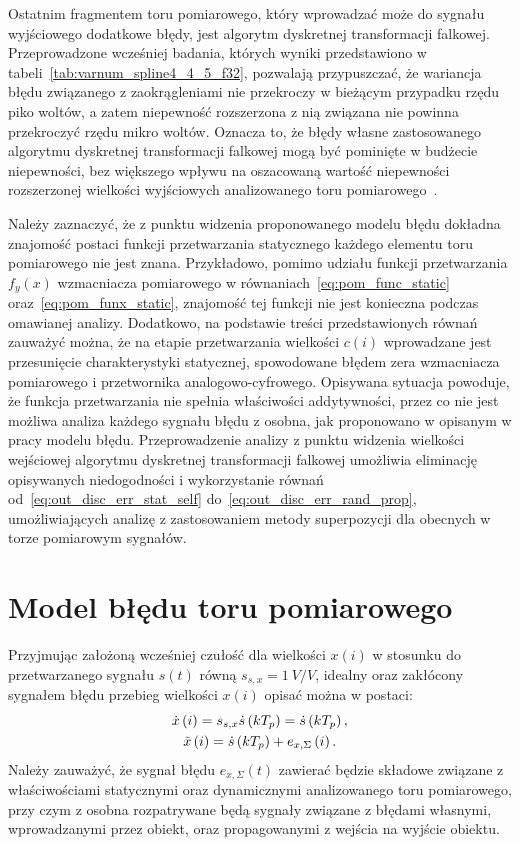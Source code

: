 Ostatnim fragmentem toru pomiarowego, który wprowadzać może do sygnału wyjściowego dodatkowe błędy, jest algorytm dyskretnej transformacji falkowej. Przeprowadzone wcześniej badania, których wyniki przedstawiono w tabeli~\ref{tab:varnum_spline4_4_5_f32}, pozwalają przypuszczać, że wariancja błędu związanego z zaokrągleniami nie przekroczy w bieżącym przypadku rzędu piko woltów, a zatem niepewność rozszerzona z nią związana nie powinna przekroczyć rzędu mikro woltów. Oznacza to, że błędy własne zastosowanego algorytmu dyskretnej transformacji falkowej mogą być pominięte w budżecie niepewności, bez większego wpływu na oszacowaną wartość niepewności rozszerzonej wielkości wyjściowych analizowanego toru pomiarowego~\cite{jcgm_guide}.

Należy zaznaczyć, że z punktu widzenia proponowanego modelu błędu dokładna znajomość postaci funkcji przetwarzania statycznego każdego elementu toru pomiarowego nie jest znana. Przykładowo, pomimo udziału funkcji przetwarzania $f_{y}(x)$ wzmacniacza pomiarowego w równaniach~\eqref{eq:pom_func_static} oraz~\eqref{eq:pom_funx_static}, znajomość tej funkcji nie jest konieczna podczas omawianej analizy. Dodatkowo, na podstawie treści przedstawionych równań zauważyć można, że na etapie przetwarzania wielkości $c(i)$ wprowadzane jest przesunięcie charakterystyki statycznej, spowodowane błędem zera wzmacniacza pomiarowego i przetwornika analogowo-cyfrowego. Opisywana sytuacja powoduje, że funkcja przetwarzania nie spełnia właściwości addytywności, przez co nie jest możliwa analiza każdego sygnału błędu z osobna, jak proponowano w opisanym w pracy modelu błędu. Przeprowadzenie analizy z punktu widzenia wielkości wejściowej algorytmu dyskretnej transformacji falkowej umożliwia eliminację opisywanych niedogodności i wykorzystanie równań od~\eqref{eq:out_disc_err_stat_self} do~\eqref{eq:out_disc_err_rand_prop}, umożliwiających analizę z zastosowaniem metody superpozycji dla obecnych w torze pomiarowym sygnałów.

\section{Model błędu toru pomiarowego}

Przyjmując założoną wcześniej czułość dla wielkości $x(i)$ w stosunku do przetwarzanego sygnału $s(t)$ równą $s_{s,x} = \qty{1}{V \per V}$, idealny oraz zakłócony sygnałem błędu przebieg wielkości $x(i)$ opisać można w postaci:
\begin{gather}
\dot{x} \left(i\right) = s_{s,x} \dot{s} \left(kT_{p}\right) = \dot{s} \left(kT_{p}\right) \label{eq:pom_dwtina_ideal}, \\
\tilde{x} \left(i\right) = \dot{s} \left(kT_{p}\right) + e_{x,\Sigma} \left(i\right) \label{eq:pom_dwtina_real}.
\end{gather}
Należy zauważyć, że sygnał błędu $e_{x,\Sigma}(t)$ zawierać będzie składowe związane z właściwościami statycznymi oraz dynamicznymi analizowanego toru pomiarowego, przy czym z osobna rozpatrywane będą sygnały związane z błędami własnymi, wprowadzanymi przez obiekt, oraz propagowanymi z wejścia na wyjście obiektu.

